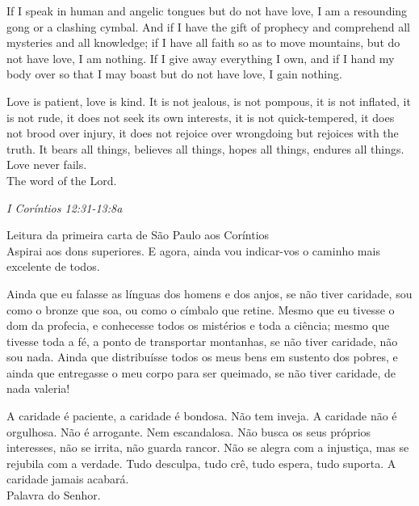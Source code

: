 \documentclass[10pt,a5]{article}
\begin{document}
\begin{paracol}{2}
If I speak in human and angelic tongues but do not have love, I am a resounding gong or a clashing cymbal.  And if I have the gift of prophecy and comprehend all mysteries and all knowledge; if I have all faith so as to move mountains, but do not have love, I am nothing.  If I give away everything I own, and if I hand my body over so that I may boast but do not have love, I gain nothing.  

Love is patient, love is kind.  It is not jealous, is not pompous, it is not inflated, it is not rude, it does not seek its own interests, it is not quick-tempered, it does not brood over injury, it does not rejoice over wrongdoing but rejoices with the truth.  It bears all things, believes all things, hopes all things, endures all things.  Love never fails.\\

The word of the Lord.


 \switchcolumn
 \textit{I Coríntios 12:31-13:8a}

\hspace{2em} Leitura da primeira carta de S\~ao Paulo aos Cor\'intios\\

Aspirai aos dons superiores. E agora, ainda vou indicar-vos o caminho mais excelente de todos.

Ainda que eu falasse as línguas dos homens e dos anjos, se não tiver caridade, sou como o bronze que soa, ou como o címbalo que retine.
Mesmo que eu tivesse o dom da profecia, e conhecesse todos os mistérios e toda a ciência; mesmo que tivesse toda a fé, a ponto de transportar montanhas, se não tiver caridade, não sou nada.
Ainda que distribuísse todos os meus bens em sustento dos pobres, e ainda que entregasse o meu corpo para ser queimado, se não tiver caridade, de nada valeria!

A caridade é paciente, a caridade é bondosa. Não tem inveja. A caridade não é orgulhosa. Não é arrogante.
Nem escandalosa. Não busca os seus próprios interesses, não se irrita, não guarda rancor.
Não se alegra com a injustiça, mas se rejubila com a verdade.
Tudo desculpa, tudo crê, tudo espera, tudo suporta.
A caridade jamais acabará. \\

Palavra do Senhor.


 \switchcolumn*

\end{paracol}
\end{document}
